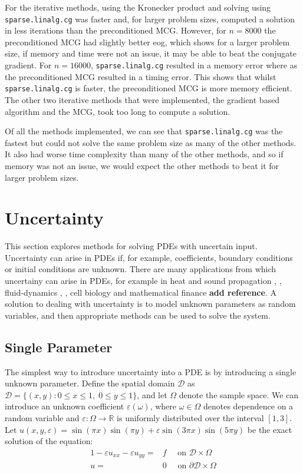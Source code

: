 \documentclass[11pt]{article}
\numberwithin{equation}{section}
\begin{document}
For the iterative methods, using the Kronecker product and solving using \texttt{sparse.linalg.cg} was faster and, for larger problem sizes, computed a solution in less iterations than the preconditioned MCG. However, for $n=8000$ the preconditioned MCG had slightly better eog, which shows for a larger problem size, if memory and time were not an issue, it may be able to beat the conjugate gradient. For $n=16000$, \texttt{sparse.linalg.cg} resulted in a memory error where as the preconditioned MCG resulted in a timing error. This shows that whilst \texttt{sparse.linalg.cg} is faster, the preconditioned MCG is more memory efficient. The other two iterative methods that were implemented, the gradient based algorithm and the MCG, took too long to compute a solution. 

Of all the methods implemented, we can see that \texttt{sparse.linalg.cg} was the fastest but could not solve the same problem size as many of the other methods. It also had worse time complexity than many of the other methods, and so if memory was not an issue, we would expect the other methods to beat it for larger problem sizes.

\newpage

\section{Uncertainty}
This section explores methods for solving PDEs with uncertain input. Uncertainty can arise in PDEs if, for example, coefficients, boundary conditions or initial conditions are unknown. There are many applications from which uncertainy can arise in PDEs, for example in heat and sound propagation \cite{Swanson}, \cite{Pryhara}, fluid-dynamics \cite{Breit}, \cite{Holm}, cell biology \cite{Bressloff} and mathematical finance \textbf{add reference}. A solution to dealing with uncertainty is to model unknown parameters as random variables, and then appropriate methods can be used to solve the system.

\subsection{Single Parameter}
The simplest way to introduce uncertainty into a PDE is by introducing a single unknown parameter. Define the spatial domain $\mathcal{D}$ as $\mathcal{D} = \{(x,y) : 0 \leq x \leq 1, \; 0 \leq y \leq 1 \}$, and let $\Omega$ denote the sample space. We can introduce an unknown coefficient $\varepsilon(\omega)$, where $\omega \in \Omega$ denotes dependence on a random variable and $\varepsilon: \Omega \rightarrow \mathbb{R}$ is uniformly distributed over the interval $[1,3]$. Let $u(x,y,\varepsilon) = \sin(\pi x)\sin(\pi y) + \varepsilon \sin(3 \pi x) \sin(5 \pi y)$ be the exact solution of the equation:
\begin{alignat}{1}
-\varepsilon u_{xx} -\varepsilon u_{yy} = {}& f \quad \text{ on } \mathcal{D} \times \Omega \nonumber \\
u = {}& 0 \quad \text{ on } \partial \mathcal{D} \times \Omega
\end{alignat}
\end{document}
